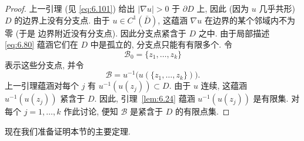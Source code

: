 \begin{proof}
上一引理 (见 \eqref{eq:6.101}) 给出 $|\nabla u|>0$ 于 $\partial D$ 上,
因此 (因为 $u$ 几乎共形) $D$ 的边界上没有分支点. 由于
$u\in C^1(\bar{D})$, 这蕴涵 $\nabla u$ 在边界的某个邻域内不为零 (于是
边界附近没有分支点). 因此分支点紧含于 $D$ 之中. 由于局部描述
\eqref{eq:6.80} 蕴涵它们在 $D$ 中是孤立的, 分支点只能有有限多个. 令
\begin{equation}
\mathcal{B}_0=\{z_1,\ldots,z_k\}
\label{eq:6.102}
\end{equation}
表示这些分支点, 并令
\begin{equation}
\mathcal{B}=u^{-1}\bigl(u(\{z_1,\ldots,z_k\})\bigr).
\label{eq:6.103}
\end{equation}
上一引理蕴涵对每个 $j$ 有 $u^{-1}(u(z_j))\subset D$. 由于 $u$ 连续,
这蕴涵 $u^{-1}(u(z_j))$ 紧含于 $D$. 因此, 引理~\ref{lem:6.24} 蕴涵
$u^{-1}(u(z_j))$ 是有限集. 对每个 $j=1,\ldots,k$ 作此讨论, 便知
$\mathcal{B}$ 是紧含于 $D$ 的有限点集.
\end{proof}

现在我们准备证明本节的主要定理.

